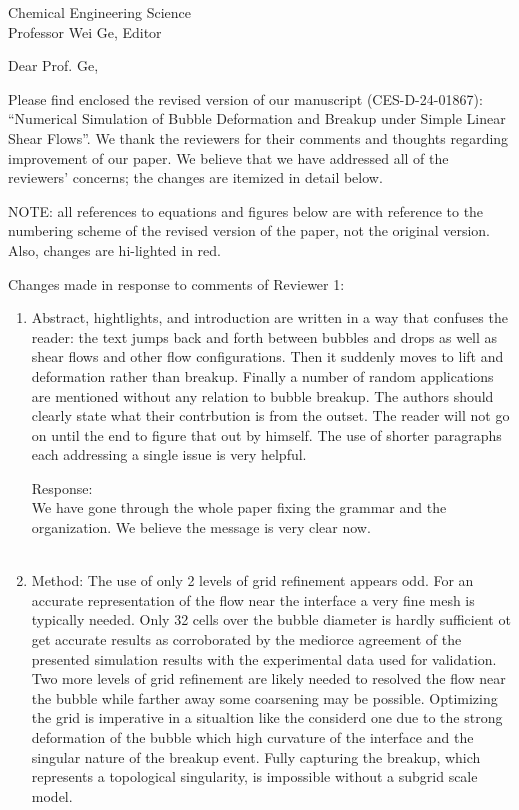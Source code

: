 \documentclass{letter}
\date{\today}
\begin{document}
\begin{letter}{
Chemical Engineering Science\\
Professor Wei Ge, Editor\\}

\opening{Dear Prof. Ge,}

Please find enclosed the revised version of our manuscript (CES-D-24-01867):
``Numerical Simulation of Bubble Deformation and Breakup under 
Simple Linear Shear Flows''.
We thank the reviewers for their comments and thoughts regarding improvement 
of our paper. We believe that we have addressed all of the reviewers’ 
concerns; the changes are itemized in detail below.

\par\noindent
NOTE: all references to equations and figures below are with
reference to the numbering scheme of the revised version of the paper,
not the original version.  Also, changes are hi-lighted in red.
\par\noindent

Changes made in response to comments of Reviewer 1: \begin{enumerate}
\item
\textsf
{Abstract, hightlights, and introduction are written in a way that confuses the reader: the text jumps back and forth between bubbles and drops as well as shear flows and other flow configurations. Then it suddenly moves to lift and deformation rather than breakup. Finally a number of random applications are mentioned without any relation to bubble breakup. The authors should clearly state what their contrbution is from the outset. The reader will not go on until the end to figure that out by himself. The use of shorter paragraphs each addressing a single issue is very helpful.}
\vspace{3 mm}

Response: \\
We have gone through the whole paper fixing the grammar and the organization.  We believe the message is very clear now. \\
\\

\item
\textsf
{Method: The use of only 2 levels of grid refinement appears odd. For an accurate representation of the flow near the interface a very fine mesh is typically needed. Only 32 cells over the bubble diameter is hardly sufficient ot get accurate results as corroborated by the mediorce agreement of the presented simulation results with the experimental data used for validation. Two more levels of grid refinement are likely needed to resolved the flow near the bubble while farther away some coarsening may be possible. Optimizing the grid is imperative in a situaltion like the considerd one due to the strong deformation of the bubble which high curvature of the interface and the singular nature of the breakup event. Fully capturing the breakup, which represents a topological singularity, is impossible without a subgrid scale model.}
\vspace{3 mm}


\end{enumerate}
\end{letter}
\end{document}
